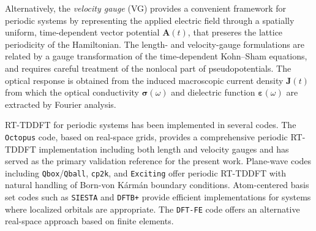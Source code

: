 Alternatively, the \emph{velocity gauge} (VG) provides a convenient framework for periodic systems by representing 
the applied electric field through a spatially uniform, time-dependent vector potential
$\mathbf{A}(t)$, that preseres  the lattice periodicity of the Hamiltonian.
The length- and velocity-gauge formulations are related by a gauge transformation 
of the time-dependent Kohn--Sham equations,\cite{Mattiat-Luber-2022,furche-2001,ding-gauge-2011}
and requires careful treatment of the nonlocal part of
pseudopotentials.\cite{pickard-mauri-2001,starace-1971,starace-1973,Mattiat-Luber-2022}
The optical response is obtained from the induced macroscopic current density $\mathbf{J}(t)$
from which the optical conductivity
$\boldsymbol{\sigma}(\omega)$ and dielectric function
$\boldsymbol{\varepsilon}(\omega)$ are extracted by Fourier analysis.

RT-TDDFT for periodic systems has been implemented in several codes.
The \texttt{Octopus} code,\cite{octopus} based on real-space grids,
provides a comprehensive periodic RT-TDDFT implementation including
both length and velocity gauges and has served as the primary
validation reference for the present work.
Plane-wave codes including \texttt{Qbox}/\texttt{Qball},\cite{qball-2017,qball-II-2021}
\texttt{cp2k},\cite{cp2k-2020} and \texttt{Exciting}\cite{exciting-2026}
offer periodic RT-TDDFT with natural handling of Born-von K\'{a}rm\'{a}n
boundary conditions.
Atom-centered basis set codes such as \texttt{SIESTA}\cite{siesta-2007}
and \texttt{DFTB+}\cite{DFTB+} provide efficient implementations for
systems where localized orbitals are appropriate.
The \texttt{DFT-FE} code\cite{gavini-rt-tddft} offers an alternative
real-space approach based on finite elements.



